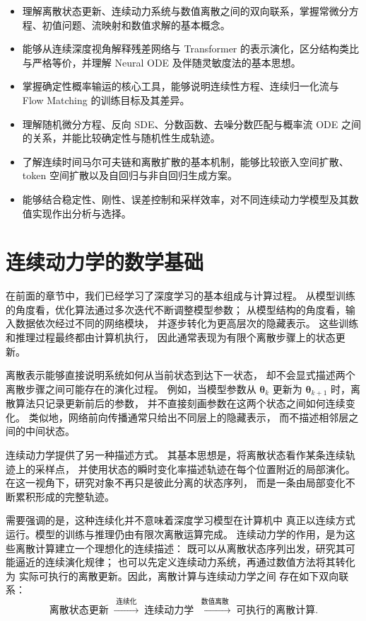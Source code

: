 \documentclass[UTF8,a4paper,zihao=-4,oneside,openany]{ctexbook}
\begin{document}
\begin{learninggoals}
  \begin{itemize}
    \item 理解离散状态更新、连续动力系统与数值离散之间的双向联系，掌握常微分方程、初值问题、流映射和数值求解的基本概念。
    \item 能够从连续深度视角解释残差网络与 Transformer 的表示演化，区分结构类比与严格等价，并理解 Neural ODE 及伴随灵敏度法的基本思想。
    \item 掌握确定性概率输运的核心工具，能够说明连续性方程、连续归一化流与 Flow Matching 的训练目标及其差异。
    \item 理解随机微分方程、反向 SDE、分数函数、去噪分数匹配与概率流 ODE 之间的关系，并能比较确定性与随机性生成轨迹。
    \item 了解连续时间马尔可夫链和离散扩散的基本机制，能够比较嵌入空间扩散、 token 空间扩散以及自回归与非自回归生成方案。
    \item 能够结合稳定性、刚性、误差控制和采样效率，对不同连续动力学模型及其数值实现作出分析与选择。
  \end{itemize}
\end{learninggoals}

\section{连续动力学的数学基础}
\label{sec:discrete-to-continuous-dynamics}

在前面的章节中，我们已经学习了深度学习的基本组成与计算过程。
从模型训练的角度看，优化算法通过多次迭代不断调整模型参数；
从模型结构的角度看，输入数据依次经过不同的网络模块，
并逐步转化为更高层次的隐藏表示。
这些训练和推理过程最终都由计算机执行，
因此通常表现为有限个离散步骤上的状态更新。

离散表示能够直接说明系统如何从当前状态到达下一状态，
却不会显式描述两个离散步骤之间可能存在的演化过程。
例如，当模型参数从
\(\boldsymbol{\theta}_k\)
更新为
\(\boldsymbol{\theta}_{k+1}\)
时，离散算法只记录更新前后的参数，
并不直接刻画参数在这两个状态之间如何连续变化。
类似地，网络前向传播通常只给出不同层上的隐藏表示，
而不描述相邻层之间的中间状态。

连续动力学提供了另一种描述方式。
其基本思想是，将离散状态看作某条连续轨迹上的采样点，
并使用状态的瞬时变化率描述轨迹在每个位置附近的局部演化。
在这一视角下，研究对象不再只是彼此分离的状态序列，
而是一条由局部变化不断累积形成的完整轨迹。

需要强调的是，这种连续化并不意味着深度学习模型在计算机中
真正以连续方式运行。模型的训练与推理仍由有限次离散运算完成。
连续动力学的作用，是为这些离散计算建立一个理想化的连续描述：
既可以从离散状态序列出发，研究其可能逼近的连续演化规律；
也可以先定义连续动力系统，再通过数值方法将其转化为
实际可执行的离散更新。因此，离散计算与连续动力学之间
存在如下双向联系：
\begin{equation}
    \text{离散状态更新}
    \;\xrightarrow{\;\text{连续化}\;}\;
    \text{连续动力学}
    \;\xrightarrow{\;\text{数值离散}\;}\;
    \text{可执行的离散计算}.
    \label{eq:discrete-continuous-discrete}
\end{equation}
\end{document}
